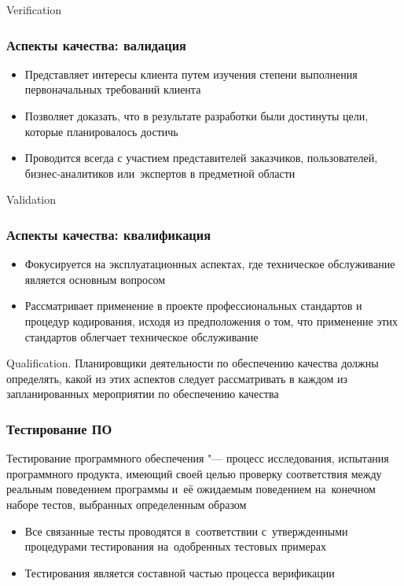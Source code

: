 \documentclass{../industrial-development}
\begin{document}
\lecturenotes 

Verification


\begin{frame} \frametitle{Аспекты качества: валидация}
 	 \begin{itemize}
\item Представляет интересы клиента путем изучения степени выполнения первоначальных требований клиента
\item Позволяет доказать, что в результате разработки были достинуты цели, которые планировалось достичь 
\item Проводится всегда с участием представителей заказчиков, пользователей, бизнес-аналитиков или~экспертов в предметной области 
  	\end{itemize}
\end{frame}
  
\lecturenotes 

Validation
 

\begin{frame} \frametitle{Аспекты качества: квалификация}
 	 \begin{itemize}
\item Фокусируется на эксплуатационных аспектах, где техническое обслуживание является основным вопросом
\item Рассматривает применение в проекте профессиональных стандартов и процедур кодирования, исходя из предположения о том, что применение этих стандартов облегчает техническое обслуживание 
  	\end{itemize}
\end{frame}

\lecturenotes

Qualification. Планировщики деятельности по обеспечению качества должны определять, какой из этих аспектов следует рассматривать в каждом из запланированных мероприятии по обеспечению качества~\cite[с.~133]{SQA-Galin}
 


\begin{frame} \frametitle{Тестирование ПО}
	\begin{block}{}
	\alert{Тестирование программного обеспечения} "--- процесс исследования, испытания программного продукта, имеющий своей целью проверку соответствия между реальным поведением программы и~её ожидаемым поведением на~конечном наборе тестов, выбранных определенным образом
	\end{block}
 	 \begin{itemize}
\item Все связанные тесты проводятся в~соответствии с~утвержденными процедурами тестирования на~одобренных тестовых примерах
\item Тестирования является составной частью процесса верификации
  	\end{itemize}
 \end{frame}
\end{document}
